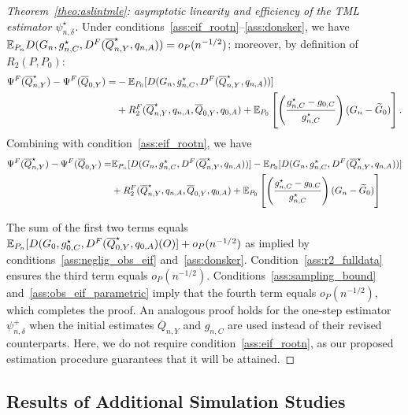 \begin{proof}[Theorem~\ref{theo:aslintmle}: asymptotic linearity and
efficiency of the TML estimator $\psi_{n,\delta}^{\star}$]\label{pf:aslintmle}
Under conditions~\ref{ass:eif_rootn}--\ref{ass:donsker}, we have $\mathbb{E}_{P_n}
D(G_n, g^{\star}_{n,C}, D^F(\overline{Q}^{\star}_{n,Y},q_{n,A})) =
o_P(n^{-1/2})$; moreover, by definition of $R_2(P, P_0)$:
\begin{align*}
  \Psi^F(\overline{Q}^{\star}_{n,Y}) - \Psi^F(\overline{Q}_{0,Y}) =
   &-\mathbb{E}_{P_0} [D(G_n, g^{\star}_{n,C},
      D^F(\overline{Q}^{\star}_{n,Y}, q_{n,A}))] \\
   &+ R^F_2(\overline{Q}^{\star}_{n,Y}, q_{n,A}, \overline{Q}_{0,Y}, q_{0,A})
  + \mathbb{E}_{P_0} \left[ \left( \frac{g^{\star}_{n,C} - g_{0,C}}
   {g^{\star}_{n,C}} \right) (G_n - \widetilde{G}_0)\right].
\end{align*}
Combining with condition~\ref{ass:eif_rootn}, we have
\begin{align*}
  \Psi^F(\overline{Q}^{\star}_{n,Y}) - \Psi^F(\overline{Q}_{0,Y}) =
  & \mathbb{E}_{P_n}[D(G_n, g^{\star}_{n,C}, D^F(\overline{Q}^{\star}_{n,Y}, q_{n,A}))]
  - \mathbb{E}_{P_0}[D(G_n, g^{\star}_{n,C}, D^F(\overline{Q}^{\star}_{n,Y},
  q_{n,A}))] \\
  &+ R^F_2(\overline{Q}^{\star}_{n,Y}, q_{n,A}, \overline{Q}_{0,Y}, q_{0,A}) +
  \mathbb{E}_{P_0} \left[ \left( \frac{g^{\star}_{n,C} - g_{0,C}}{g^{\star}_{n,C}}
  \right) (G_n - \widetilde{G}_0) \right]
\end{align*}

The sum of the first two terms equals $\mathbb{E}_{P_n}[D(G_0, g^{\star}_{0,C},
D^F(\overline{Q}^{\star}_{0,Y}, q_{0,A})(O)] + o_{P}(n^{-1/2})$ as implied by
conditions~\ref{ass:neglig_obs_eif} and~\ref{ass:donsker}.
Condition~\ref{ass:r2_fulldata} ensures the third term equals $o_{P}(n^{-1/2})$.
Conditions~\ref{ass:sampling_bound} and~\ref{ass:obs_eif_parametric} imply that
the fourth term equals $o_P(n^{-1/2})$, which completes the proof. An analogous
proof holds for the one-step estimator $\psi_{n,\delta}^{+}$ when the initial
estimates $\overline{Q}_{n,Y}$ and $g_{n,C}$ are used instead of their revised
counterparts. Here, we do not require condition~\ref{ass:eif_rootn}, as our
proposed estimation procedure guarantees that it will be attained.
\end{proof}

\subsection{Results of Additional Simulation Studies}\label{more_sims}


